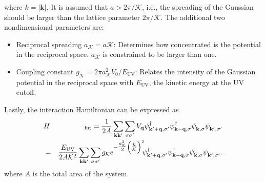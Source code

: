 \documentclass[english,aps,prd,nofootinbib,twocolumn]{revtex4-1}
\begin{document}
where $k=|\mathbf{k}|$. It is assumed that $a>2\pi/\mathcal{K}$, i.e., the spreading of the Gaussian should be larger than the lattice parameter $2\pi/\mathcal{K}$. The additional two nondimensional parameters are:
\begin{itemize}
\item Reciprocal spreading $a_{\mathcal{K}}=a\mathcal{K}$: Determines how concentrated is the potential in the reciprocal space. $a_{\mathcal{K}}$ is constrained to be larger than one.
\item Coupling constant $g_{\mathcal{K}}=2\pi a_{\mathcal{K}}^{2}V_{0}/E_{\mathrm{UV}}$: Relates the intensity of the Gaussian potential in the reciprocal space with $E_{\mathrm{UV}}$, the kinetic energy at the UV cutoff. 
\end{itemize}
Lastly, the interaction Hamiltonian can be expressed as
\begin{eqnarray}
&H&\!_{\mathrm{int}} =
\frac{1}{2A}
\sum_{\mathbf{k }\mathbf{k'}}
\sum_{\sigma \sigma'} 
V_{\mathbf{q}}
\psi_{\mathbf{k'+q,\sigma'}}^{\textcolor{black}{\dagger}}
\psi_{\mathbf{k -q,\sigma }}^{\textcolor{black}{\dagger}}
\psi_{\mathbf{k   ,\sigma }}^{\textcolor{white}{\dagger}}
\psi_{\mathbf{k'  ,\sigma'}}^{\textcolor{white}{\dagger}} \\
 &=& \nonumber \frac{E_{\mathrm{UV}}}{2A\mathcal{K}^{2}}
\sum_{\mathbf{k }\mathbf{k'}}
\sum_{\sigma \sigma'} 
g_{\mathcal{K}}
e^{-\tfrac{a_{\mathcal{K}}^{2}}{2}\left( \tfrac{k}{\mathcal{K}} \right)^{2}}
\!\! 
\psi_{\mathbf{k'+q,\sigma'}}^{\textcolor{black}{\dagger}}
\psi_{\mathbf{k -q,\sigma }}^{\textcolor{black}{\dagger}}
\psi_{\mathbf{k   ,\sigma }}^{\textcolor{white}{\dagger}}
\psi_{\mathbf{k'  ,\sigma'}}^{\textcolor{white}{\dagger}}.
\end{eqnarray}
where $A$ is the total area of the system.
\end{document}
